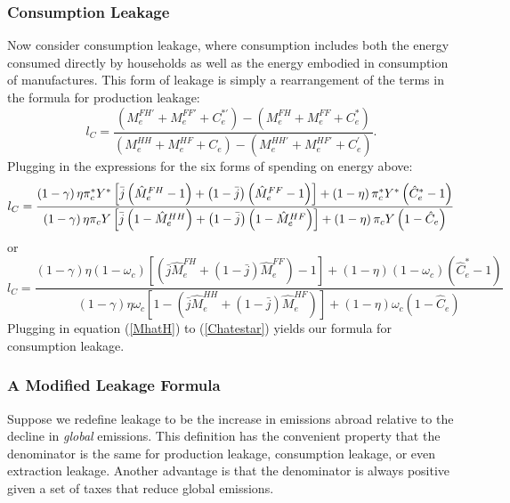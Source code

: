 \documentclass[notitlepage,12pt]{article}
\begin{document}
\subsubsection{Consumption Leakage}

Now consider consumption leakage, where consumption includes both the energy
consumed directly by households as well as the energy embodied in
consumption of manufactures. This form of leakage is simply a rearrangement
of the terms in the formula for production leakage:%
\begin{equation*}
l_{C}=\frac{\left( M_{e}^{FH\prime }+M_{e}^{FF\prime }+C_{e}^{\ast \prime
}\right) -\left( M_{e}^{FH}+M_{e}^{FF}+C_{e}^{\ast }\right) }{\left(
M_{e}^{HH}+M_{e}^{HF}+C_{e}\right) -\left( M_{e}^{HH\prime }+M_{e}^{HF\prime
}+C_{e}^{\prime }\right) }.
\end{equation*}%
Plugging in the expressions for the six forms of spending on energy above:%
\begin{equation*}
l_{C}=\frac{\left( 1-\gamma \right) \eta \pi _{c}^{\ast }Y^{\ast }\left[ 
\bar{j}\left( \hat{M}_{e}^{FH}-1\right) +\left( 1-\bar{j}\right) \left( \hat{%
M}_{e}^{FF}-1\right) \right] +\left( 1-\eta \right) \pi _{c}^{\ast }Y^{\ast
}\left( \hat{C}_{e}^{\ast }-1\right) }{\left( 1-\gamma \right) \eta \pi _{c}Y%
\left[ \bar{j}\left( 1-\hat{M}_{e}^{HH}\right) +\left( 1-\bar{j}\right)
\left( 1-\hat{M}_{e}^{HF}\right) \right] +\left( 1-\eta \right) \pi
_{c}Y\left( 1-\hat{C}_{e}\right) }
\end{equation*}%
or%
\begin{equation*}
l_{C}=\frac{\left( 1-\gamma \right) \eta \left( 1-\omega _{c}\right) \left[
\left( \bar{j}\hat{M}_{e}^{FH}+\left( 1-\bar{j}\right) \hat{M}%
_{e}^{FF}\right) -1\right] +\left( 1-\eta \right) \left( 1-\omega
_{c}\right) \left( \hat{C}_{e}^{\ast }-1\right) }{\left( 1-\gamma \right)
\eta \omega _{c}\left[ 1-\left( \bar{j}\hat{M}_{e}^{HH}+\left( 1-\bar{j}%
\right) \hat{M}_{e}^{HF}\right) \right] +\left( 1-\eta \right) \omega
_{c}\left( 1-\hat{C}_{e}\right) }
\end{equation*}%
Plugging in equation (\ref{MhatH}) to (\ref{Chatestar}) yields our formula
for consumption leakage.

\subsubsection{A Modified Leakage Formula}

Suppose we redefine leakage to be the increase in emissions abroad relative
to the decline in \emph{global} emissions. This definition has the
convenient property that the denominator is the same for production leakage,
consumption leakage, or even extraction leakage. Another advantage is that
the denominator is always positive given a set of taxes that reduce global
emissions.
\end{document}
